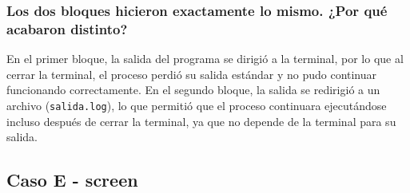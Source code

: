 \documentclass[12pt, letterpaper]{article}
\begin{document}
\subsubsection*{Los dos bloques hicieron exactamente lo mismo. ¿Por qué acabaron distinto?}

En el primer bloque, la salida del programa se dirigió a la terminal, por lo que al cerrar la terminal, el proceso perdió su salida estándar y no pudo continuar funcionando correctamente. En el segundo bloque, la salida se redirigió a un archivo (\texttt{salida.log}), lo que permitió que el proceso continuara ejecutándose incluso después de cerrar la terminal, ya que no depende de la terminal para su salida.

\subsection*{\fontsize{12}{17}\selectfont Caso E - screen}
\end{document}
